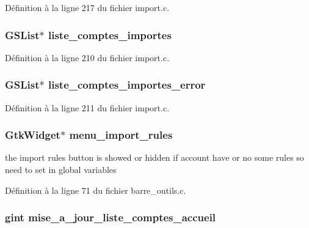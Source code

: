 Définition à la ligne 217 du fichier import.c.

\subsubsection[{liste\_\-comptes\_\-importes}]{\setlength{\rightskip}{0pt plus 5cm}GSList$\ast$ {\bf liste\_\-comptes\_\-importes}}\label{import_8c_a78273b1077a17a5b03056ffebb17a140}


Définition à la ligne 210 du fichier import.c.

\subsubsection[{liste\_\-comptes\_\-importes\_\-error}]{\setlength{\rightskip}{0pt plus 5cm}GSList$\ast$ {\bf liste\_\-comptes\_\-importes\_\-error}}\label{import_8c_a6e161f53c7a853cfac180c82953b5111}


Définition à la ligne 211 du fichier import.c.

\subsubsection[{menu\_\-import\_\-rules}]{\setlength{\rightskip}{0pt plus 5cm}GtkWidget$\ast$ {\bf menu\_\-import\_\-rules}}\label{import_8c_ae624b78f586a9e3f5d60e6f2e2866819}
the import rules button is showed or hidden if account have or no some rules so need to set in global variables 

Définition à la ligne 71 du fichier barre\_\-outils.c.

\subsubsection[{mise\_\-a\_\-jour\_\-liste\_\-comptes\_\-accueil}]{\setlength{\rightskip}{0pt plus 5cm}gint {\bf mise\_\-a\_\-jour\_\-liste\_\-comptes\_\-accueil}}\label{import_8c_a018917e8dacfd8fbe4e94d0f99a59c08}



